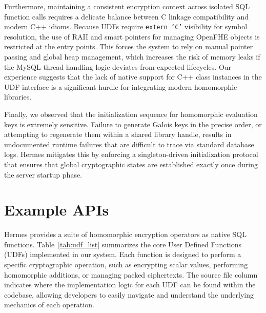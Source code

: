 \documentclass[sigconf,nonacm]{acmart}
\begin{document}
Furthermore, maintaining a consistent encryption context across isolated SQL function calls requires a delicate balance between C linkage compatibility and modern C++ idioms. Because UDFs require \texttt{extern `C'} visibility for symbol resolution, the use of RAII and smart pointers for managing OpenFHE objects is restricted at the entry points. This forces the system to rely on manual pointer passing and global heap management, which increases the risk of memory leaks if the MySQL thread handling logic deviates from expected lifecycles. Our experience suggests that the lack of native support for C++ class instances in the UDF interface is a significant hurdle for integrating modern homomorphic libraries.

Finally, we observed that the initialization sequence for homomorphic evaluation keys is extremely sensitive. Failure to generate Galois keys in the precise order, or attempting to regenerate them within a shared library handle, results in undocumented runtime failures that are difficult to trace via standard database logs. Hermes mitigates this by enforcing a singleton-driven initialization protocol that ensures that global cryptographic states are established exactly once during the server startup phase. 

\section{Example APIs}
\label{appendix:api}

Hermes provides a suite of homomorphic encryption operators as native SQL functions. Table~\ref{tab:udf_list} summarizes the core User Defined Functions (UDFs) implemented in our system. Each function is designed to perform a specific cryptographic operation, such as encrypting scalar values, performing homomorphic additions, or managing packed ciphertexts. The source file column indicates where the implementation logic for each UDF can be found within the codebase, allowing developers to easily navigate and understand the underlying mechanics of each operation.
\end{document}
